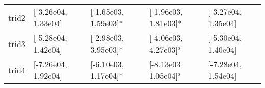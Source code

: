 \begin{table*}[tb]
\begin{tabular}{@{}p{1.4cm}L{2.55cm}L{2.7cm}L{2.6cm}L{2.5cm}@{}}
		trid2 & [-3.26e04, 1.33e04] & [-1.65e03, 1.59e03]* & [-1.96e03, 1.81e03]* & [-3.27e04, 1.35e04]\\
		\mydashline{}
		trid3 & [-5.28e04, 1.42e04] & [-2.98e03, 3.95e03]* & [-4.06e03, 4.27e03]* & [-5.30e04, 1.40e04] \\
		\mydashline{}
		trid4 & [-7.26e04, 1.92e04] & [-6.10e03, 1.17e04]* & [-8.13e03  1.05e04]* & [-7.28e04, 1.54e04]\\
		\bottomrule
	\end{tabular}
\end{table*}

